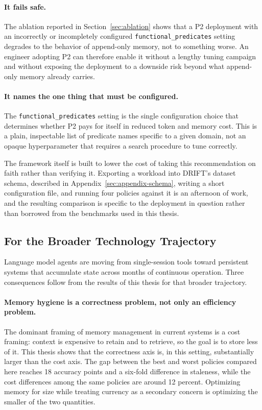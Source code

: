 \paragraph{It fails safe.} The ablation reported in Section~\ref{sec:ablation} shows that a P2 deployment with an incorrectly or incompletely configured \texttt{functional\_predicates} setting degrades to the behavior of append-only memory, not to something worse. An engineer adopting P2 can therefore enable it without a lengthy tuning campaign and without exposing the deployment to a downside risk beyond what append-only memory already carries.

\paragraph{It names the one thing that must be configured.} The \texttt{functional\_predicates} setting is the single configuration choice that determines whether P2 pays for itself in reduced token and memory cost. This is a plain, inspectable list of predicate names specific to a given domain, not an opaque hyperparameter that requires a search procedure to tune correctly.

The framework itself is built to lower the cost of taking this recommendation on faith rather than verifying it. Exporting a workload into DRIFT's dataset schema, described in Appendix~\ref{sec:appendix-schema}, writing a short configuration file, and running four policies against it is an afternoon of work, and the resulting comparison is specific to the deployment in question rather than borrowed from the benchmarks used in this thesis.

\subsection{For the Broader Technology Trajectory}
\label{sec:impact-trajectory}

Language model agents are moving from single-session tools toward persistent systems that accumulate state across months of continuous operation. Three consequences follow from the results of this thesis for that broader trajectory.

\paragraph{Memory hygiene is a correctness problem, not only an efficiency problem.} The dominant framing of memory management in current systems is a cost framing: context is expensive to retain and to retrieve, so the goal is to store less of it. This thesis shows that the correctness axis is, in this setting, substantially larger than the cost axis. The gap between the best and worst policies compared here reaches 18 accuracy points and a six-fold difference in staleness, while the cost differences among the same policies are around 12 percent. Optimizing memory for size while treating currency as a secondary concern is optimizing the smaller of the two quantities.

